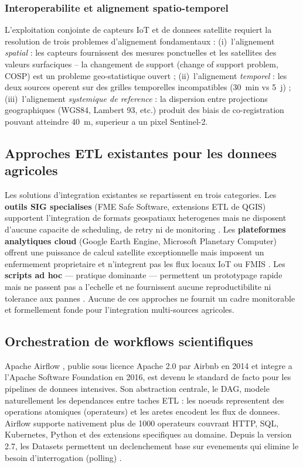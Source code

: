 \documentclass[12pt,a4paper]{article}
\theoremstyle{plain}
\theoremstyle{definition}
\theoremstyle{remark}
\begin{document}
\subsubsection{Interoperabilite et alignement spatio-temporel}

L'exploitation conjointe de capteurs IoT et de donnees satellite requiert
la resolution de trois problemes d'alignement fondamentaux :
(i)~l'alignement \emph{spatial} : les capteurs fournissent des mesures
ponctuelles et les satellites des valeurs surfaciques -- la changement
de support (change of support problem, COSP) est un probleme geo-statistique
ouvert \cite{change_of_support} ;
(ii)~l'alignement \emph{temporel} : les deux sources operent sur des
grilles temporelles incompatibles (30~min vs 5~j) ;
(iii)~l'alignement \emph{systemique de reference} : la dispersion
entre projections geographiques (WGS84, Lambert 93, etc.) produit des
biais de co-registration pouvant atteindre 40~m, superieur a un pixel
Sentinel-2.

\subsection{Approches ETL existantes pour les donnees agricoles}

Les solutions d'integration existantes se repartissent en trois categories.
Les \textbf{outils SIG specialises} (FME Safe Software, extensions ETL
de QGIS) supportent l'integration de formats geospatiaux heterogenes
mais ne disposent d'aucune capacite de scheduling, de retry ni de
monitoring \cite{fme_agri}.
Les \textbf{plateformes analytiques cloud} (Google Earth Engine,
Microsoft Planetary Computer) offrent une puissance de calcul satellite
exceptionnelle mais imposent un enfermement proprietaire et n'integrent
pas les flux locaux IoT ou FMIS \cite{gee_agriculture}.
Les \textbf{scripts ad hoc} --- pratique dominante --- permettent un
prototypage rapide mais ne passent pas a l'echelle et ne fournissent
aucune reproductibilite ni tolerance aux pannes \cite{pipeline_survey_2024}.
Aucune de ces approches ne fournit un cadre monitorable et formellement
fonde pour l'integration multi-sources agricoles.

\subsection{Orchestration de workflows scientifiques}

Apache Airflow \cite{airflow_docs}, publie sous licence Apache 2.0 par
Airbnb en 2014 et integre a l'Apache Software Foundation en 2016, est
devenu le standard de facto pour les pipelines de donnees intensives.
Son abstraction centrale, le DAG, modele naturellement les dependances
entre taches ETL : les noeuds representent des operations atomiques
(operateurs) et les aretes encodent les flux de donnees.
Airflow supporte nativement plus de 1000 operateurs couvrant HTTP,
SQL, Kubernetes, Python et des extensions specifiques au domaine.
Depuis la version 2.7, les Datasets permettent un declenchement base
sur evenements qui elimine le besoin d'interrogation (polling)
\cite{airflow_docs}.
\end{document}
